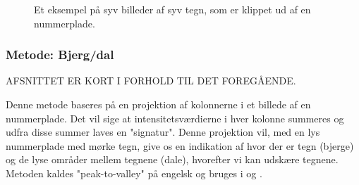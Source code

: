 \begin{figure}[htp]
  \centering
  \begin{minipage}[c]{8 cm}
	\end{minipage}
  \caption{Et eksempel på syv billeder af syv tegn, som er klippet ud af en nummerplade.}
  \label{fig:tegn-udklip}
\end{figure}

\subsubsection*{Metode: Bjerg/dal}

AFSNITTET ER KORT I FORHOLD TIL DET FOREGÅENDE.

Denne metode baseres på en projektion af kolonnerne i et billede af en nummerplade. Det vil sige at intensitetsværdierne i hver kolonne summeres og udfra disse summer laves en "signatur". Denne projektion vil, med en lys nummerplade med mørke tegn, give os en indikation af hvor der er tegn (bjerge) og de lyse områder mellem tegnene (dale), hvorefter vi kan udskære tegnene. Metoden kaldes "peak-to-valley" på engelsk og bruges i \cite{ron} og \cite{kwas}.

